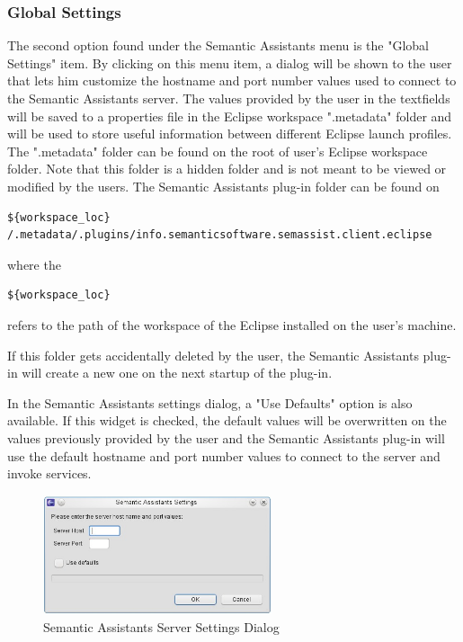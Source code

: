 \subsubsection{Global Settings}
The second option found under the Semantic Assistants menu is the "Global
Settings" item. By clicking on this menu item, a dialog will be shown to the
user that lets him customize the hostname and port number values used to connect
to the Semantic Assistants server. The values provided by the user in the
textfields will be saved to a properties file in the Eclipse workspace
".metadata" folder and will be used to store useful information between
different Eclipse launch profiles. The ".metadata" folder can be found on the
root of user's Eclipse workspace folder. Note that this folder is a hidden
folder and is not meant to be viewed or modified by the users. The Semantic
Assistants plug-in folder can be found on
\begin{verbatim}
${workspace_loc}
/.metadata/.plugins/info.semanticsoftware.semassist.client.eclipse
\end{verbatim} 

where the \begin{verbatim}${workspace_loc}\end{verbatim} refers to the path of
the workspace of the Eclipse installed on the user's machine.

If this folder gets accidentally deleted by the user, the Semantic Assistants
plug-in will create a new one on the next startup of the plug-in.

In the Semantic Assistants settings dialog, a "Use Defaults" option is also
available. If this widget is checked, the default values will be overwritten on
the values previously provided by the user and the Semantic Assistants plug-in
will use the default hostname and port number values to connect to the server
and invoke services.
\begin{figure}[htb]
\begin{center}
  \includegraphics[width=0.6\textwidth]{pictures/eclipse_settings.jpg}
  \caption{Semantic Assistants Server Settings Dialog}
  \label{fig:eclipse_settings}
\end{center}
\end{figure}

